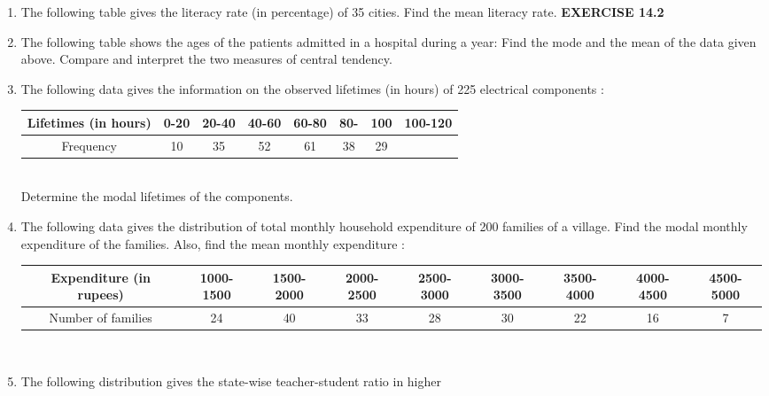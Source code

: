 \begin{enumerate}[label=\arabic*.,ref=\thesubsection.\theenumi]
\item The following table gives the literacy rate (in percentage) of 35 cities. Find the mean
literacy rate.
{\Large \textbf{EXERCISE 14.2}}\\
\item The following table shows the ages of the patients admitted in a hospital during a year:
Find the mode and the mean of the data given above. Compare and interpret the two
measures of central tendency.
\item The following data gives the information on the observed lifetimes (in hours) of 225
electrical components :
\begin{tabular}{|c|c|c|c|c|c|c|c|}
\hline
Lifetimes (in hours)&0-20&20-40&40-60&60-80&80-&100&100-120\\
\hline
Frequency&10&35&52&61&38&29\\
\hline
\end{tabular}\\
Determine the modal lifetimes of the components.
\item The following data gives the distribution of total monthly household expenditure of 200
families of a village. Find the modal monthly expenditure of the families. Also, find the
mean monthly expenditure :
\begin{tabular}{|c|c|c|c|c|c|c|c|c|}
\hline
Expenditure (in rupees)&1000-1500&1500-2000&2000-2500&2500-3000&3000-3500&3500-4000&4000-4500& 4500-5000\\
\hline
Number of families&24&40&33&28&30&22&16&7\\
\hline
\end{tabular}\\
\item The following distribution gives the state-wise teacher-student ratio in higher

\end{enumerate}
